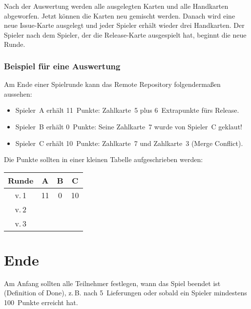 \documentclass[DIV=15, fontsize=11pt]{gitgame}
\begin{document}
Nach der Auswertung werden alle ausgelegten Karten und alle Handkarten abgeworfen. Jetzt können die Karten neu gemischt werden. Danach wird eine neue Issue-Karte ausgelegt und jeder Spieler erhält wieder drei Handkarten. Der Spieler nach dem Spieler, der die Release-Karte ausgespielt hat, beginnt die neue Runde.


\subsubsection*{Beispiel für eine Auswertung}
Am Ende einer Spielrunde kann das Remote Repository folgendermaßen aussehen:

\begin{center}
\end{center}

\begin{itemize}
	\item Spieler~A erhält 11~Punkte: Zahlkarte~5 plus 6~Extrapunkte fürs Release.
	\item Spieler~B erhält 0~Punkte: Seine Zahlkarte~7 wurde von Spieler~C geklaut!
	\item Spieler~C erhält 10~Punkte: Zahlkarte~7 und Zahlkarte~3 (Merge Conflict).
\end{itemize}

Die Punkte sollten in einer kleinen Tabelle aufgeschrieben werden:

\begin{center}
\begin{tabular}{c|c|c|c}
	Runde & A & B & C \\
	\hline
	v.\,1 & 11 & 0 & 10 \\
	\hline
	v.\,2 &  & & \\
	\hline
	v.\,3 &  & & \\
\end{tabular}
\end{center}



\section{Ende\label{ende}}
Am Anfang sollten alle Teilnehmer festlegen, wann das Spiel beendet ist (Definition of Done), z.\,B. nach 5~Lieferungen oder sobald ein Spieler mindestens 100~Punkte erreicht hat.
\end{document}
